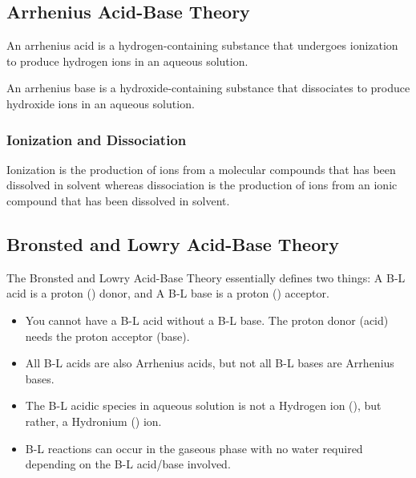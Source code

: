 \subsection{Arrhenius Acid-Base Theory}


\begin{defn}
An arrhenius acid is a hydrogen-containing substance that undergoes ionization to produce hydrogen ions in an aqueous solution.
\end{defn}

\begin{example}
\end{example}

\begin{defn}
An arrhenius base is a hydroxide-containing substance that dissociates to produce hydroxide ions in an aqueous solution.
\end{defn}

\begin{example}
\end{example}

\subsubsection{Ionization and Dissociation}

\begin{defn}
Ionization is the production of ions from a molecular compounds that has been dissolved in solvent whereas dissociation is the production of ions from an ionic compound that has been dissolved in solvent.
\end{defn}

\subsection{Bronsted and Lowry Acid-Base Theory}

\begin{defn}
The Bronsted and Lowry Acid-Base Theory essentially defines two things: A B-L acid is a proton () donor, and A B-L base is a proton () acceptor.
\end{defn}

\begin{itemize}
\item You cannot have a B-L acid without a B-L base. The proton donor (acid) needs the proton acceptor (base).
\item All B-L acids are also Arrhenius acids, but not all B-L bases are Arrhenius bases.
\item The B-L acidic species in aqueous solution is not a Hydrogen ion (), but rather, a Hydronium () ion.
\item B-L reactions can occur in the gaseous phase with no water required depending on the B-L acid/base involved.
\end{itemize}

